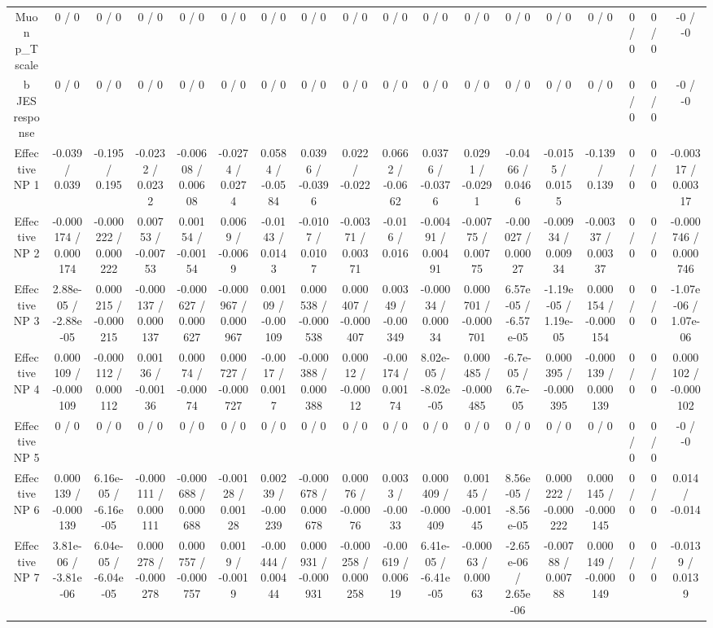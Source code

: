 \documentclass[10pt]{article}
\begin{document}
\begin{table}[htbp]
\begin{center}
\begin{tabular}{|c|c|c|c|c|c|c|c|c|c|c|c|c|c|c|c|c|c|}
  Muon p_{T} scale & 0 / 0 & 0 / 0 & 0 / 0 & 0 / 0 & 0 / 0 & 0 / 0 & 0 / 0 & 0 / 0 & 0 / 0 & 0 / 0 & 0 / 0 & 0 / 0 & 0 / 0 & 0 / 0 & 0 / 0 & 0 / 0 & -0 / -0 \\ 
  b JES response & 0 / 0 & 0 / 0 & 0 / 0 & 0 / 0 & 0 / 0 & 0 / 0 & 0 / 0 & 0 / 0 & 0 / 0 & 0 / 0 & 0 / 0 & 0 / 0 & 0 / 0 & 0 / 0 & 0 / 0 & 0 / 0 & -0 / -0 \\ 
  Effective NP 1 & -0.039 / 0.039 & -0.195 / 0.195 & -0.0232 / 0.0232 & -0.00608 / 0.00608 & -0.0274 / 0.0274 & 0.0584 / -0.0584 & 0.0396 / -0.0396 & 0.022 / -0.022 & 0.0662 / -0.0662 & 0.0376 / -0.0376 & 0.0291 / -0.0291 & -0.0466 / 0.0466 & -0.0155 / 0.0155 & -0.139 / 0.139 & 0 / 0 & 0 / 0 & -0.00317 / 0.00317 \\ 
  Effective NP 2 & -0.000174 / 0.000174 & -0.000222 / 0.000222 & 0.00753 / -0.00753 & 0.00154 / -0.00154 & 0.0069 / -0.0069 & -0.0143 / 0.0143 & -0.0107 / 0.0107 & -0.00371 / 0.00371 & -0.016 / 0.016 & -0.00491 / 0.00491 & -0.00775 / 0.00775 & -0.00027 / 0.00027 & -0.00934 / 0.00934 & -0.00337 / 0.00337 & 0 / 0 & 0 / 0 & -0.000746 / 0.000746 \\ 
  Effective NP 3 & 2.88e-05 / -2.88e-05 & 0.000215 / -0.000215 & -0.000137 / 0.000137 & -0.000627 / 0.000627 & -0.000967 / 0.000967 & 0.00109 / -0.00109 & 0.000538 / -0.000538 & 0.000407 / -0.000407 & 0.00349 / -0.00349 & -0.00034 / 0.00034 & 0.000701 / -0.000701 & 6.57e-05 / -6.57e-05 & -1.19e-05 / 1.19e-05 & 0.000154 / -0.000154 & 0 / 0 & 0 / 0 & -1.07e-06 / 1.07e-06 \\ 
  Effective NP 4 & 0.000109 / -0.000109 & -0.000112 / 0.000112 & 0.00136 / -0.00136 & 0.00074 / -0.00074 & 0.000727 / -0.000727 & -0.0017 / 0.0017 & -0.000388 / 0.000388 & 0.00012 / -0.00012 & -0.00174 / 0.00174 & 8.02e-05 / -8.02e-05 & 0.000485 / -0.000485 & -6.7e-05 / 6.7e-05 & 0.000395 / -0.000395 & -0.000139 / 0.000139 & 0 / 0 & 0 / 0 & 0.000102 / -0.000102 \\ 
  Effective NP 5 & 0 / 0 & 0 / 0 & 0 / 0 & 0 / 0 & 0 / 0 & 0 / 0 & 0 / 0 & 0 / 0 & 0 / 0 & 0 / 0 & 0 / 0 & 0 / 0 & 0 / 0 & 0 / 0 & 0 / 0 & 0 / 0 & -0 / -0 \\ 
  Effective NP 6 & 0.000139 / -0.000139 & 6.16e-05 / -6.16e-05 & -0.000111 / 0.000111 & -0.000688 / 0.000688 & -0.00128 / 0.00128 & 0.00239 / -0.00239 & -0.000678 / 0.000678 & 0.00076 / -0.00076 & 0.0033 / -0.0033 & 0.000409 / -0.000409 & 0.00145 / -0.00145 & 8.56e-05 / -8.56e-05 & 0.000222 / -0.000222 & 0.000145 / -0.000145 & 0 / 0 & 0 / 0 & 0.014 / -0.014 \\ 
  Effective NP 7 & 3.81e-06 / -3.81e-06 & 6.04e-05 / -6.04e-05 & 0.000278 / -0.000278 & 0.000757 / -0.000757 & 0.0019 / -0.0019 & -0.00444 / 0.00444 & 0.000931 / -0.000931 & -0.000258 / 0.000258 & -0.00619 / 0.00619 & 6.41e-05 / -6.41e-05 & -0.00063 / 0.00063 & -2.65e-06 / 2.65e-06 & -0.00788 / 0.00788 & 0.000149 / -0.000149 & 0 / 0 & 0 / 0 & -0.0139 / 0.0139 \\ 

\end{tabular}
\end{center}
\end{table}
\end{document}
